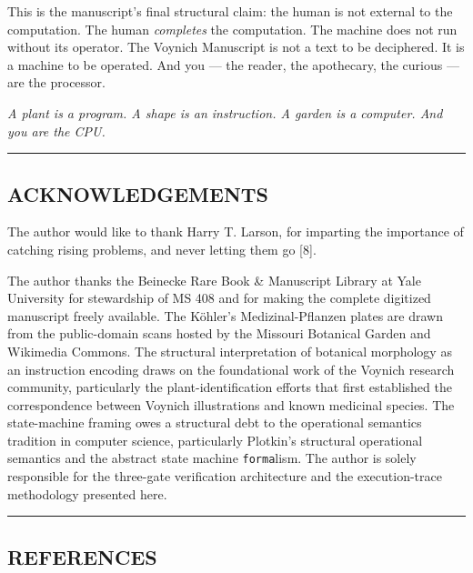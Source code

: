 This is the manuscript's final structural claim: the human is not
external to the computation. The human \emph{completes} the computation.
The machine does not run without its operator. The Voynich Manuscript is
not a text to be deciphered. It is a machine to be operated. And you ---
the reader, the apothecary, the curious --- are the processor.

\emph{A plant is a program. A shape is an instruction. A garden is a
computer. And you are the CPU.}

\begin{center}\rule{0.5\linewidth}{0.5pt}\end{center}

\hypertarget{acknowledgements}{%
\subsection{ACKNOWLEDGEMENTS}\label{acknowledgements}}

The author would like to thank Harry T. Larson, for imparting the
importance of catching rising problems, and never letting them go
{[}8{]}.

The author thanks the Beinecke Rare Book \& Manuscript Library at Yale
University for stewardship of MS 408 and for making the complete
digitized manuscript freely available. The Köhler's Medizinal-Pflanzen
plates are drawn from the public-domain scans hosted by the Missouri
Botanical Garden and Wikimedia Commons. The structural interpretation of
botanical morphology as an instruction encoding draws on the
foundational work of the Voynich research community, particularly the
plant-identification efforts that first established the correspondence
between Voynich illustrations and known medicinal species. The
state-machine framing owes a structural debt to the operational
semantics tradition in computer science, particularly Plotkin's
structural operational semantics and the abstract state machine
\texttt{forma}lism. The author is solely responsible for the three-gate
verification architecture and the execution-trace methodology presented
here.

\begin{center}\rule{0.5\linewidth}{0.5pt}\end{center}

\hypertarget{references}{%
\subsection{REFERENCES}\label{references}}

